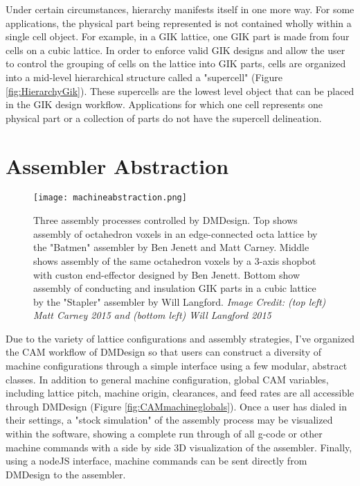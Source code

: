 {Under certain circumstances, hierarchy manifests itself in one more way.  For some applications, the physical part being represented is not contained wholly within a single cell object.  For example, in a GIK lattice, one GIK part is made from four cells on a cubic lattice.  In order to enforce valid GIK designs and allow the user to control the grouping of cells on the lattice into GIK parts, cells are organized into a mid-level hierarchical structure called a "supercell" (Figure \ref{fig:HierarchyGik}).  These supercells are the lowest level object that can be placed in the GIK design workflow.  Applications for which one cell represents one physical part or a collection of parts do not have the supercell delineation.

\section{Assembler Abstraction}

\begin{figure}
  \texttt{[image: machineabstraction.png]}
  \caption{Three assembly processes controlled by DMDesign.  Top shows assembly of octahedron voxels in an edge-connected octa lattice by the "Batmen" assembler by Ben Jenett and Matt Carney.  Middle shows assembly of the same octahedron voxels by a 3-axis shopbot with custon end-effector designed by Ben Jenett.  Bottom show assembly of conducting and insulation GIK parts in a cubic lattice by the "Stapler" assembler by Will Langford.  \textit{Image Credit: (top left) Matt Carney 2015 and (bottom left) Will Langford 2015}}
  \label{fig:machineabstraction}
\end{figure}

Due to the variety of lattice configurations and assembly strategies, I've organized the CAM workflow of DMDesign so that users can construct a diversity of machine configurations through a simple interface using a few modular, abstract classes.  In addition to general machine configuration, global CAM variables, including lattice pitch, machine origin, clearances, and feed rates are all accessible through DMDesign (Figure \ref{fig:CAMmachineglobals}).  Once a user has dialed in their settings, a "stock simulation" of the assembly process may be visualized within the software, showing a complete run through of all g-code or other machine commands with a side by side 3D visualization of the assembler.  Finally, using a nodeJS interface, machine commands can be sent directly from DMDesign to the assembler.\\

}
